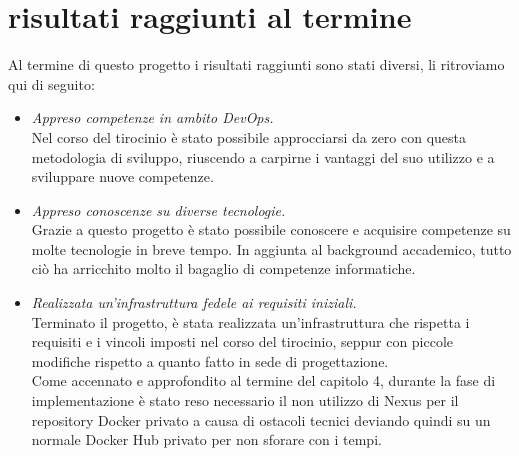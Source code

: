 \documentclass[a4paper,12pt]{report}
\begin{document}
\section{risultati raggiunti al termine}
Al termine di questo progetto i risultati raggiunti sono stati diversi, li ritroviamo qui di seguito:\\
\begin{itemize}
\item \textit{Appreso competenze in ambito DevOps.}\\
Nel corso del tirocinio è stato possibile approcciarsi da zero con questa metodologia di sviluppo, riuscendo a carpirne i vantaggi del suo utilizzo e a sviluppare nuove competenze.\\
\item \textit{Appreso conoscenze su diverse tecnologie.}\\
Grazie a questo progetto è stato possibile conoscere e acquisire competenze su molte tecnologie in breve tempo. In aggiunta al background accademico, tutto ciò ha arricchito molto il bagaglio di competenze informatiche.\\
\item \textit{Realizzata un'infrastruttura fedele ai requisiti iniziali.}\\
Terminato il progetto, è stata realizzata un'infrastruttura che rispetta i requisiti e i vincoli imposti nel corso del tirocinio, seppur con piccole modifiche rispetto a quanto fatto in sede di progettazione.\\
Come accennato e approfondito al termine del capitolo 4, durante la fase di implementazione è stato reso necessario il non utilizzo di Nexus per il repository Docker privato a causa di ostacoli tecnici deviando quindi su un normale Docker Hub privato per non sforare con i tempi.
\end{itemize}
\end{document}
